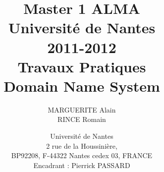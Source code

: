 \documentclass[12pt,a4paper,utf8x]{report}
\title
{
	\normalsize{Master 1 ALMA\\
	Université de Nantes\\
	2011-2012}\\
	\vspace{15mm}
	\Huge{Travaux Pratiques\\ Domain Name System}
}
\author{MARGUERITE Alain\\RINCE Romain
	\vspace{45mm}
}
\date
{	
	\normalsize{Université de Nantes \\ 2 rue de la Houssinière,\\ BP92208, F-44322 Nantes cedex 03, FRANCE
	\\ 
	\vspace{5mm}	
	Encadrant : Pierrick PASSARD\\
	}
}
\begin{document}
\maketitle


\tableofcontents
\clearpage

\begin{onehalfspace}





\end{onehalfspace}


\printindex

\appendix
\end{document}
